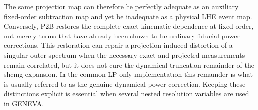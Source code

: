 \documentclass[11pt]{article}
\begin{document}
The same projection map can therefore be perfectly adequate as an auxiliary fixed-order subtraction map and
yet be inadequate as a physical LHE event map. Conversely, P2B restores the complete exact kinematic
dependence at fixed order, not merely terms that have already been shown to be ordinary fiducial power
corrections. This restoration can repair a projection-induced distortion of a singular outer spectrum when
the necessary exact and projected measurements remain correlated, but it does not cure the dynamical
truncation remainder of the slicing expansion. In the common LP-only implementation this remainder is what
is usually referred to as the genuine dynamical power correction. Keeping these distinctions explicit is
essential when several nested resolution variables are used in GENEVA.
\end{document}
